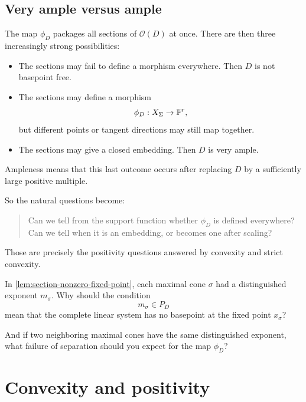 \subsection{Very ample versus ample}

The map \(\phi_D\) packages all sections of \(\mathcal O(D)\) at once.
There are then three increasingly strong possibilities:

\begin{itemize}
\item The sections may fail to define a morphism everywhere. Then
\(D\) is not basepoint free.

\item The sections may define a morphism
\[
\phi_D:X_\Sigma\to \mathbb{P}^r,
\]
but different points or tangent directions may still map together.

\item The sections may give a closed embedding. Then \(D\) is very
ample.
\end{itemize}

Ampleness means that this last outcome occurs after replacing \(D\) by
a sufficiently large positive multiple.

So the natural questions become:
\begin{quote}
Can we tell from the support function whether \(\phi_D\) is defined
everywhere? Can we tell when it is an embedding, or becomes one after
scaling?
\end{quote}
Those are precisely the positivity questions answered by convexity and
strict convexity.

\begin{guidingquestion}
In \cref{lem:section-nonzero-fixed-point}, each maximal cone \(\sigma\)
had a distinguished exponent \(m_\sigma\). Why should the condition
\[
m_\sigma\in P_D
\]
mean that the complete linear system has no basepoint at the fixed
point \(x_\sigma\)?

And if two neighboring maximal cones have the same distinguished
exponent, what failure of separation should you expect for the map
\(\phi_D\)?
\end{guidingquestion}

\section{Convexity and positivity}
\label{sec:convexity-positivity}

